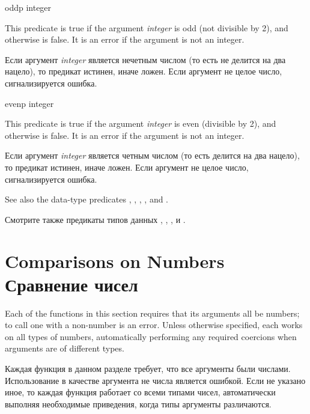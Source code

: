 \begin{defun}[Function]
oddp integer

This predicate is true if the argument \emph{integer} is odd (not divisible
by 2), and otherwise is false.  It is an error if the argument is not
an integer.

Если аргумент \emph{integer} является нечетным числом (то есть не делится на два
нацело), то предикат истинен, иначе ложен.
Если аргумент не целое число, сигнализируется ошибка.
\end{defun}

\begin{defun}[Function]
evenp integer

This predicate is true if the argument \emph{integer} is even (divisible
by 2), and otherwise is false.  It is an error if the argument is not
an integer.

Если аргумент \emph{integer} является четным числом (то есть делится на два
нацело), то предикат истинен, иначе ложен.
Если аргумент не целое число, сигнализируется ошибка.
\end{defun}

See also the data-type predicates ,
, , , and .

Смотрите также предикаты типов данных ,
, ,  и .

\section{Comparisons on Numbers Сравнение чисел}

Each of the functions in this section requires that its arguments all be
numbers; to call one with a non-number is an error.  Unless otherwise
specified, each works on all types of numbers, automatically performing
any required coercions when arguments are of different types.

Каждая функция в данном разделе требует, что все аргументы были
числами. Использование в качестве аргумента не числа является ошибкой. Если не
указано иное, то каждая функция работает со всеми типами чисел, автоматически
выполняя необходимые приведения, когда типы аргументы различаются.

